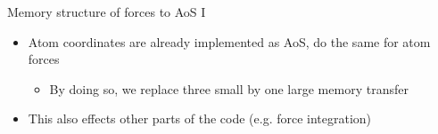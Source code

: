\documentclass[12pt,xcolor={rgb},t]{beamer}
\begin{document}
\begin{frame}[fragile]{Memory structure of forces to AoS I}

    \begin{itemize}
        \item Atom coordinates are already implemented as AoS, do the same for atom forces
        \begin{itemize}
            \item By doing so, we replace three small by one large memory transfer
        \end{itemize}
        \item This also effects other parts of the code (e.g. force integration)
        \vspace*{1em}
        \begin{figure}[!H]
            \centering
        \end{figure}
    \end{itemize}

\end{frame}
\end{document}

